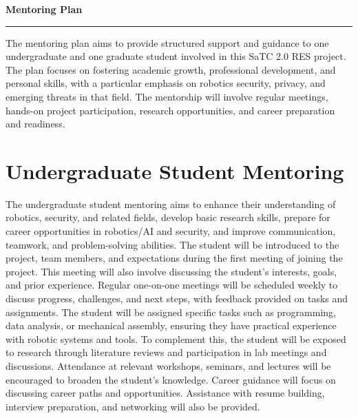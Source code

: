 \setcounter{section}{0}

{\Large\bfseries\filcenter
Mentoring Plan
\\\rule{\textwidth}{0.4pt}}

The mentoring plan aims to provide structured support and guidance to one undergraduate and one graduate student involved in this SaTC 2.0 RES project. The plan focuses on fostering academic growth, professional development, and personal skills, with a particular emphasis on robotics security, privacy, and emerging threats in that field. The mentorship will involve regular meetings, hands-on project participation, research opportunities, and career preparation and readiness.

\section*{Undergraduate Student Mentoring}

The undergraduate student mentoring aims to enhance their understanding of robotics, security, and related fields, develop basic research skills, prepare for career opportunities in robotics/AI and security, and improve communication, teamwork, and problem-solving abilities.
The student will be introduced to the project, team members, and expectations during the first meeting of joining the project. 
This meeting will also involve discussing the student's interests, goals, and prior experience. Regular one-on-one meetings will be scheduled weekly to discuss progress, challenges, and next steps, with feedback provided on tasks and assignments.
The student will be assigned specific tasks such as programming, data analysis, or mechanical assembly, ensuring they have practical experience with robotic systems and tools. 
To complement this, the student will be exposed to research through literature reviews and participation in lab meetings and discussions.
Attendance at relevant workshops, seminars, and lectures will be encouraged to broaden the student's knowledge. 
Career guidance will focus on discussing career paths and opportunities.
Assistance with resume building, interview preparation, and networking will also be provided. 

